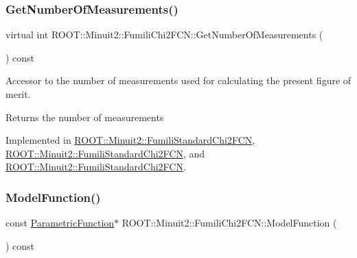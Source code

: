 \subsubsection{\texorpdfstring{GetNumberOfMeasurements()}{GetNumberOfMeasurements()}\hspace{0.1cm}{\footnotesize\ttfamily [3/3]}}
{\footnotesize\ttfamily virtual int R\+O\+O\+T\+::\+Minuit2\+::\+Fumili\+Chi2\+F\+C\+N\+::\+Get\+Number\+Of\+Measurements (\begin{DoxyParamCaption}{ }\end{DoxyParamCaption}) const\hspace{0.3cm}{\ttfamily [pure virtual]}}

Accessor to the number of measurements used for calculating the present figure of merit.

\begin{DoxyReturn}{Returns}
the number of measurements 
\end{DoxyReturn}


Implemented in \mbox{\hyperlink{classROOT_1_1Minuit2_1_1FumiliStandardChi2FCN_a27414beb35c9c18156e6b3781aaf587f}{R\+O\+O\+T\+::\+Minuit2\+::\+Fumili\+Standard\+Chi2\+F\+CN}}, \mbox{\hyperlink{classROOT_1_1Minuit2_1_1FumiliStandardChi2FCN_a868b7c1aa7d2597db475ca99799c9131}{R\+O\+O\+T\+::\+Minuit2\+::\+Fumili\+Standard\+Chi2\+F\+CN}}, and \mbox{\hyperlink{classROOT_1_1Minuit2_1_1FumiliStandardChi2FCN_a868b7c1aa7d2597db475ca99799c9131}{R\+O\+O\+T\+::\+Minuit2\+::\+Fumili\+Standard\+Chi2\+F\+CN}}.

\mbox{\label{classROOT_1_1Minuit2_1_1FumiliChi2FCN_a3d31739e476a413e0c5616bb0c6283b9}} 
\subsubsection{\texorpdfstring{ModelFunction()}{ModelFunction()}\hspace{0.1cm}{\footnotesize\ttfamily [1/3]}}
{\footnotesize\ttfamily const \mbox{\hyperlink{classROOT_1_1Minuit2_1_1ParametricFunction}{Parametric\+Function}}$\ast$ R\+O\+O\+T\+::\+Minuit2\+::\+Fumili\+Chi2\+F\+C\+N\+::\+Model\+Function (\begin{DoxyParamCaption}{ }\end{DoxyParamCaption}) const\hspace{0.3cm}{\ttfamily [inline]}}

